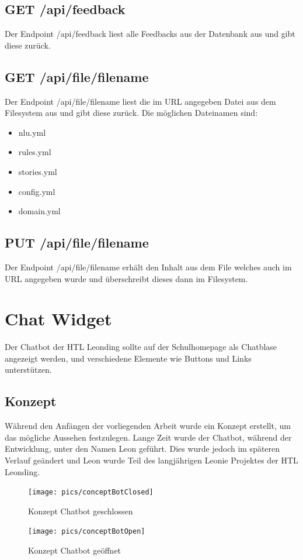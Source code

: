 \subsection{GET /api/feedback}
Der Endpoint /api/feedback liest alle Feedbacks aus der Datenbank aus und gibt diese zurück.

\subsection{GET /api/file/{filename}}
Der Endpoint /api/file/{filename} liest die im URL angegeben Datei aus dem Filesystem aus und gibt diese zurück.
Die möglichen Dateinamen sind:

\begin{itemize}
    \item nlu.yml
    \item rules.yml
    \item stories.yml
    \item config.yml
    \item domain.yml
\end{itemize}

\subsection{PUT /api/file/{filename}}
Der Endpoint /api/file/{filename} erhält den Inhalt aus dem File welches auch im URL angegeben wurde und überschreibt dieses dann im Filesystem.

\section{Chat Widget}\label{sec:chat-widget}
Der Chatbot der HTL Leonding sollte auf der Schulhomepage als Chatblase angezeigt werden, und verschiedene Elemente wie Buttons und Links unterstützen.

\subsection{Konzept}
Während den Anfängen der vorliegenden Arbeit wurde ein Konzept erstellt, um das mögliche Aussehen festzulegen.
Lange Zeit wurde der Chatbot, während der Entwicklung, unter den Namen Leon geführt.
Dies wurde jedoch im späteren Verlauf geändert und Leon wurde Teil des langjährigen Leonie Projektes der HTL Leonding.

\begin{figure}[hbt!]
    \centering
    \texttt{[image: pics/conceptBotClosed]}
    \caption{Konzept Chatbot geschlossen}
    \label{fig:impl:conceptBotClosed}
\end{figure}
\begin{figure}[hbt!]
    \centering
    \texttt{[image: pics/conceptBotOpen]}
    \caption{Konzept Chatbot geöffnet}
    \label{fig:impl:conceptBotOpen}
\end{figure}

